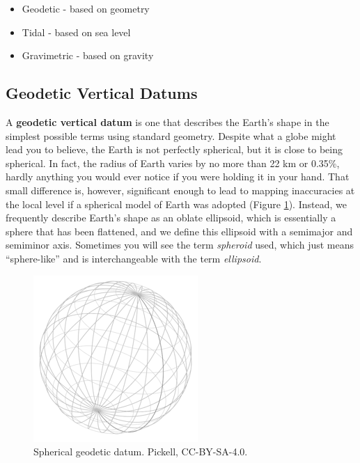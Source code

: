 \documentclass[
]{book}
\providecommand{\tightlist}{%
  \setlength{\itemsep}{0pt}\setlength{\parskip}{0pt}}
\begin{document}
\begin{itemize}
\tightlist
\item
  Geodetic - based on geometry
\item
  Tidal - based on sea level
\item
  Gravimetric - based on gravity
\end{itemize}

\hypertarget{geodetic-vertical-datums}{%
\subsection{Geodetic Vertical Datums}\label{geodetic-vertical-datums}}

A \textbf{geodetic vertical datum} is one that describes the Earth's shape in the simplest possible terms using standard geometry. Despite what a globe might lead you to believe, the Earth is not perfectly spherical, but it is close to being spherical. In fact, the radius of Earth varies by no more than 22 km or 0.35\%, hardly anything you would ever notice if you were holding it in your hand. That small difference is, however, significant enough to lead to mapping inaccuracies at the local level if a spherical model of Earth was adopted (Figure \ref{fig:2-geodetic-datum}). Instead, we frequently describe Earth's shape as an oblate ellipsoid, which is essentially a sphere that has been flattened, and we define this ellipsoid with a semimajor and semiminor axis. Sometimes you will see the term \emph{spheroid} used, which just means ``sphere-like'' and is interchangeable with the term \emph{ellipsoid}.

\begin{figure}
\includegraphics[width=0.75\linewidth]{images/02-geodetic-datum} \caption{Spherical geodetic datum. Pickell, CC-BY-SA-4.0.}\label{fig:2-geodetic-datum}
\end{figure}
\end{document}
